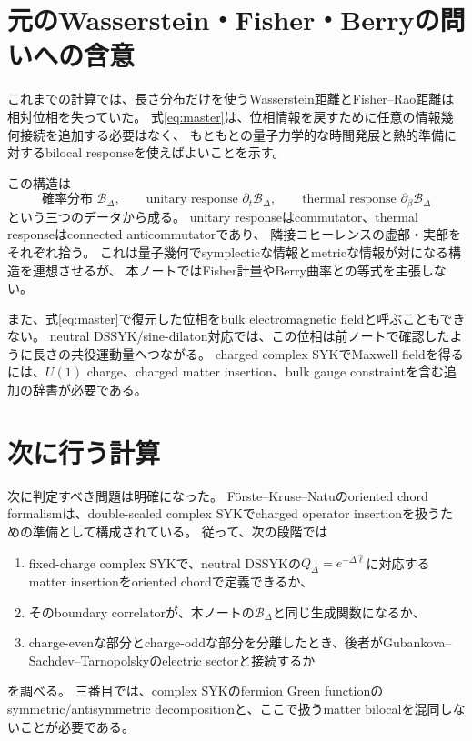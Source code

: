 \documentclass[a4paper,11pt]{ltjsarticle}
\numberwithin{equation}{section}
\begin{document}
\section{元のWasserstein・Fisher・Berryの問いへの含意}
これまでの計算では、長さ分布だけを使うWasserstein距離とFisher--Rao距離は相対位相を失っていた。
式\eqref{eq:master}は、位相情報を戻すために任意の情報幾何接続を追加する必要はなく、
もともとの量子力学的な時間発展と熱的準備に対するbilocal responseを使えばよいことを示す。

この構造は
\begin{equation}
 \text{確率分布 }\mathcal B_\Delta,
 \qquad
 \text{unitary response }\partial_t\mathcal B_\Delta,
 \qquad
 \text{thermal response }\partial_\beta\mathcal B_\Delta
 \label{eq:threepieces}
\end{equation}
という三つのデータから成る。
unitary responseはcommutator、thermal responseはconnected anticommutatorであり、
隣接コヒーレンスの虚部・実部をそれぞれ拾う。
これは量子幾何でsymplecticな情報とmetricな情報が対になる構造を連想させるが、
本ノートではFisher計量やBerry曲率との等式を主張しない。

また、式\eqref{eq:master}で復元した位相をbulk electromagnetic fieldと呼ぶこともできない。
neutral DSSYK/sine-dilaton対応では、この位相は前ノートで確認したように長さの共役運動量へつながる。
charged complex SYKでMaxwell fieldを得るには、$U(1)$ charge、charged matter insertion、bulk gauge constraintを含む追加の辞書が必要である。

\section{次に行う計算}
次に判定すべき問題は明確になった。
F\"orste--Kruse--Natuのoriented chord formalismは、double-scaled complex SYKでcharged operator insertionを扱うための準備として構成されている\cite{Forste}。
従って、次の段階では
\begin{enumerate}
 \item fixed-charge complex SYKで、neutral DSSYKの$Q_\Delta=e^{-\Delta\hat\ell}$に対応するmatter insertionをoriented chordで定義できるか、
 \item そのboundary correlatorが、本ノートの$\mathcal B_\Delta$と同じ生成関数になるか、
 \item charge-evenな部分とcharge-oddな部分を分離したとき、後者がGubankova--Sachdev--\allowbreak Tarnopolskyのelectric sectorと接続するか
\end{enumerate}
を調べる。
三番目では、complex SYKのfermion Green functionのsymmetric/antisymmetric decompositionと、ここで扱うmatter bilocalを混同しないことが必要である\cite{GST}。
\end{document}
